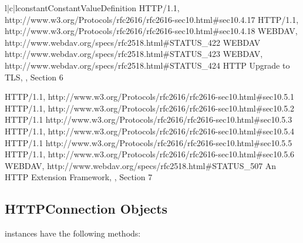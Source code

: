 \begin{tableiii}{l|c|l}{constant}{Constant}{Value}{Definition}
    {HTTP/1.1, 
      {http://www.w3.org/Protocols/rfc2616/rfc2616-sec10.html#sec10.4.17}}
    {HTTP/1.1, 
      {http://www.w3.org/Protocols/rfc2616/rfc2616-sec10.html#sec10.4.18}}
    {WEBDAV, 
      {http://www.webdav.org/specs/rfc2518.html#STATUS_422}}
    {WEBDAV 
      {http://www.webdav.org/specs/rfc2518.html#STATUS_423}}
    {WEBDAV, 
      {http://www.webdav.org/specs/rfc2518.html#STATUS_424}}
    {HTTP Upgrade to TLS, , Section 6}

    {HTTP/1.1, 
      {http://www.w3.org/Protocols/rfc2616/rfc2616-sec10.html#sec10.5.1}}
    {HTTP/1.1, 
      {http://www.w3.org/Protocols/rfc2616/rfc2616-sec10.html#sec10.5.2}}
    {HTTP/1.1 
      {http://www.w3.org/Protocols/rfc2616/rfc2616-sec10.html#sec10.5.3}}
    {HTTP/1.1, 
      {http://www.w3.org/Protocols/rfc2616/rfc2616-sec10.html#sec10.5.4}}
    {HTTP/1.1 
      {http://www.w3.org/Protocols/rfc2616/rfc2616-sec10.html#sec10.5.5}}
    {HTTP/1.1, 
      {http://www.w3.org/Protocols/rfc2616/rfc2616-sec10.html#sec10.5.6}}
    {WEBDAV, 
      {http://www.webdav.org/specs/rfc2518.html#STATUS_507}}
    {An HTTP Extension Framework, , Section 7}
\end{tableiii}

\subsection{HTTPConnection Objects \label{httpconnection-objects}}

 instances have the following methods:

